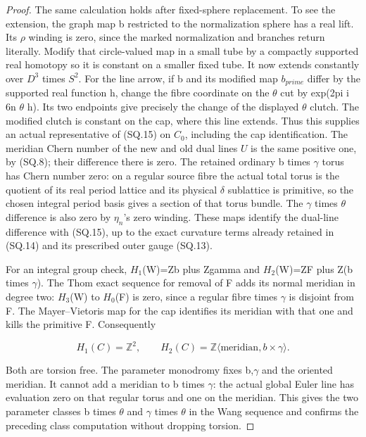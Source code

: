 \begin{proof}
The same calculation holds after fixed-sphere replacement. To see the
extension, the graph map b restricted to the normalization sphere has
a real lift. Its \(\rho\) winding is zero, since the marked normalization
and branches return literally. Modify that circle-valued map in a
small tube by a compactly supported real homotopy so it is constant
on a smaller fixed tube. It now extends constantly over \(D^{3}\) times \(S^{2}\).
For the line arrow, if b and its modified map \(b_{prime}\) differ by the
supported real function h, change the fibre coordinate on the \(\theta\)
cut by exp(2pi i 6n \(\theta\) h). Its two endpoints give precisely the
change of the displayed \(\theta\) clutch. The modified clutch is constant
on the cap, where this line extends. Thus this supplies an actual
representative of (SQ.15) on \(C_{0}\), including the cap identification. The
meridian Chern number of the new and old dual lines \(U\) is
the same positive one, by (SQ.8); their difference there is zero.
The retained ordinary b times \(\gamma\) torus has Chern number zero:
on a regular source fibre the actual total torus is the quotient of
its real period lattice and its physical \(\delta\) sublattice is primitive,
so the chosen integral period basis gives a section of that torus
bundle. The \(\gamma\) times \(\theta\) difference is also zero by \(\eta_{n}\)'s
zero winding. These maps identify the dual-line difference with
(SQ.15), up to the exact curvature terms already retained in (SQ.14)
and its prescribed outer gauge (SQ.13).

For an integral group check, \(H_{1}\)(W)=Zb plus Zgamma and
\(H_{2}\)(W)=ZF plus Z(b times \(\gamma\)). The Thom exact sequence for removal
of F adds its normal meridian in degree two: \(H_{3}\)(W) to \(H_{0}\)(F) is
zero, since a regular fibre times \(\gamma\) is disjoint from F. The
Mayer--Vietoris map for the cap identifies its meridian with that
one and kills the primitive F. Consequently

\[
 H_1(C)=\mathbb Z^2,\qquad
 H_2(C)=\mathbb Z\langle\text{meridian},b\times\gamma\rangle.
                                                        \tag{SQ.16}
\]

Both are torsion free. The parameter monodromy fixes b,\(\gamma\) and
the oriented meridian. It cannot add a meridian to b times \(\gamma\):
the actual global Euler line has evaluation zero on that regular
torus and one on the meridian. This gives the two parameter classes
b times \(\theta\) and \(\gamma\) times \(\theta\) in the Wang sequence and
confirms the preceding class computation without dropping torsion.


\end{proof}
